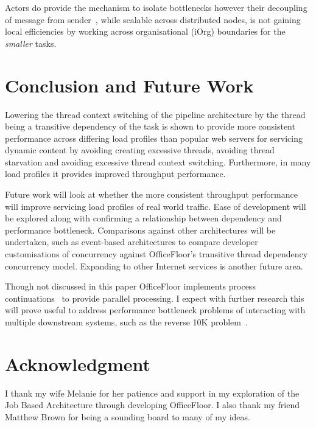 \documentclass[conference]{ieee/IEEEtran}
\begin{document}
Actors do provide the mechanism to isolate bottlenecks however their decoupling
of message from sender~\cite{actors}, while scalable across distributed nodes,
is not gaining local efficiencies by working across organisational (iOrg)
boundaries for the \textit{smaller} tasks.


\section{Conclusion and Future Work}
Lowering the thread context switching of the pipeline architecture by the thread
being a transitive dependency of the task is shown to provide more consistent
performance across differing load profiles than popular web servers for
servicing dynamic content by avoiding creating excessive threads, avoiding
thread starvation and avoiding excessive thread context switching.  Furthermore,
in many load profiles it provides improved throughput performance.

Future work will look at whether the more consistent throughput performance will
improve servicing load profiles of real world traffic.  Ease of development will
be explored along with confirming a relationship between dependency and
performance bottleneck.  Comparisons against other architectures will be
undertaken, such as event-based architectures to compare developer
customisations of concurrency against OfficeFloor's transitive thread dependency
concurrency model.  Expanding to other Internet services is another future area.

Though not discussed in this paper OfficeFloor implements process
continuations~\cite{process-continuation} to provide parallel processing.  I
expect with further research this will prove useful to address performance
bottleneck problems of interacting with multiple downstream systems, such as the
reverse 10K problem~\cite{reverse-ten-k-problem}.









\section*{Acknowledgment} I thank my wife Melanie for her patience and support
in my exploration of the Job Based Architecture through developing OfficeFloor. 
I also thank my friend Matthew Brown for being a sounding board to many of my
ideas.
\end{document}
